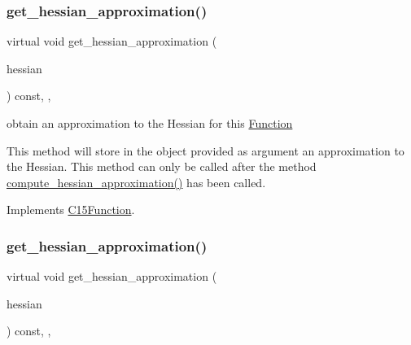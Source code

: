 \subsubsection{\texorpdfstring{get\+\_\+hessian\+\_\+approximation()}{get\_hessian\_approximation()}\hspace{0.1cm}{\footnotesize\ttfamily [1/2]}}
{\footnotesize\ttfamily virtual void get\+\_\+hessian\+\_\+approximation (\begin{DoxyParamCaption}\item[{\mbox{\hyperlink{class_s_m_spp__di__unipi__it_1_1_c15_function_ae7dd5ecf6e8711dc10787bb8d80b355b}{Dense\+Hessian}} \&}]{hessian }\end{DoxyParamCaption}) const\hspace{0.3cm}{\ttfamily [final]}, {\ttfamily [override]}, {\ttfamily [virtual]}}



obtain an approximation to the Hessian for this \mbox{\hyperlink{class_s_m_spp__di__unipi__it_1_1_function}{Function}} 

This method will store in the object provided as argument an approximation to the Hessian. This method can only be called after the method \mbox{\hyperlink{class_s_m_spp__di__unipi__it_1_1_linear_function_a4aab1ee65194b8af72eb1c122205c707}{compute\+\_\+hessian\+\_\+approximation()}} has been called. 

Implements \mbox{\hyperlink{class_s_m_spp__di__unipi__it_1_1_c15_function_a83dab9644742319aa313786952a15a78}{C15\+Function}}.

\mbox{\label{class_s_m_spp__di__unipi__it_1_1_linear_function_a5950a5291f5ffab2cc9c42e33b7e6f27}} 
\subsubsection{\texorpdfstring{get\+\_\+hessian\+\_\+approximation()}{get\_hessian\_approximation()}\hspace{0.1cm}{\footnotesize\ttfamily [2/2]}}
{\footnotesize\ttfamily virtual void get\+\_\+hessian\+\_\+approximation (\begin{DoxyParamCaption}\item[{\mbox{\hyperlink{class_s_m_spp__di__unipi__it_1_1_c15_function_af95b7c5c0969f493222b30b17aa58515}{Sparse\+Hessian}} \&}]{hessian }\end{DoxyParamCaption}) const\hspace{0.3cm}{\ttfamily [final]}, {\ttfamily [override]}, {\ttfamily [virtual]}}



